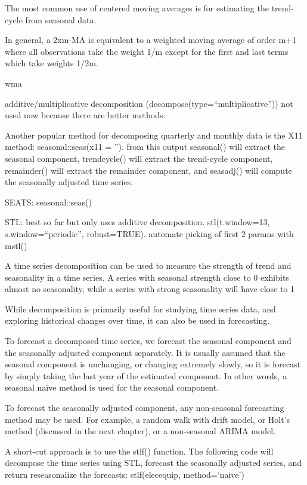 \documentclass[]{book}
\begin{document}
The most common use of centered moving averages is for estimating the
trend-cycle from seasonal data.

In general, a 2xm-MA is equivalent to a weighted moving average of order
m+1 where all observations take the weight 1/m except for the first and
last terms which take weights 1/2m.

wma

additive/multiplicative decomposition
(decompose(type=``multiplicative'')) not used now because there are
better methods.

Another popular method for decomposing quarterly and monthly data is the
X11 method: seasonal::seas(x11 = ''). from this output seasonal() will
extract the seasonal component, trendcycle() will extract the
trend-cycle component, remainder() will extract the remainder component,
and seasadj() will compute the seasonally adjusted time series.

SEATS: seasonal::seas()

STL: best so far but only uses additive decomposition. stl(t.window=13,
s.window=``periodic'', robust=TRUE). automate picking of first 2 params
with mstl()

A time series decomposition can be used to measure the strength of trend
and seasonality in a time series. A series with seasonal strength close
to 0 exhibits almost no seasonality, while a series with strong
seasonality will have close to 1

While decomposition is primarily useful for studying time series data,
and exploring historical changes over time, it can also be used in
forecasting.

To forecast a decomposed time series, we forecast the seasonal component
and the seasonally adjusted component separately. It is usually assumed
that the seasonal component is unchanging, or changing extremely slowly,
so it is forecast by simply taking the last year of the estimated
component. In other words, a seasonal naïve method is used for the
seasonal component.

To forecast the seasonally adjusted component, any non-seasonal
forecasting method may be used. For example, a random walk with drift
model, or Holt's method (discussed in the next chapter), or a
non-seasonal ARIMA model.

A short-cut approach is to use the stlf() function. The following code
will decompose the time series using STL, forecast the seasonally
adjusted series, and return reseasonalize the forecasts: stlf(elecequip,
method=`naive')
\end{document}
